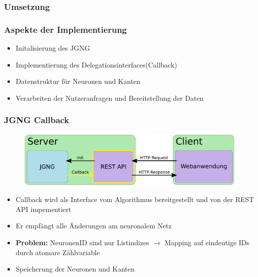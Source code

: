 \subsubsection*{Umsetzung}
\begin{frame}
    \frametitle{Aspekte der Implementierung}
    \begin{itemize}
        \item Initalisierung des JGNG
        \item Implementierung des Delegationsinterfaces(Callback)
        \item Datenstruktur für Neuronen und Kanten
        \item Verarbeiten der Nutzeranfragen und Bereitstellung der Daten
    \end{itemize}
\end{frame}
\begin{frame}
    \frametitle{JGNG Callback}
    \begin{figure}[h]
        \centering
        \includegraphics[width=\textwidth]{bilder/client-server_callback-active.pdf}
    \end{figure}
    \begin{itemize}
        \item Callback wird als Interface vom Algorithmus bereitgestellt und von der REST API impementiert
        \item Er empfängt alle Änderungen am neuronalem Netz
        \item \textbf{Problem:} NeuronenID sind nur Listindizes
        \newline $\rightarrow$ Mapping auf eindeutige IDs durch atomare Zählvariable
        \item Speicherung der Neuronen und Kanten
    \end{itemize}
\end{frame}
